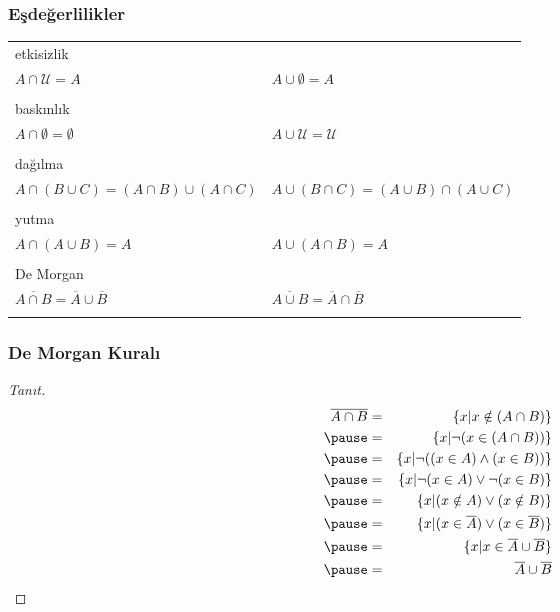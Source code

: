\documentclass[dvipsnames]{beamer}
\theoremstyle{definition}
\theoremstyle{example}
\theoremstyle{plain}
\begin{document}
\begin{frame}
  \frametitle{Eşdeğerlilikler}

  \begin{tabular}{ll}
    \alert{etkisizlik} &\\
      $A \cap \mathcal{U} = A$ &
      $A \cup \emptyset = A$\\\\
    \pause
    \alert{baskınlık} &\\
      $A \cap \emptyset = \emptyset$ &
      $A \cup \mathcal{U} = \mathcal{U}$\\\\
    \pause
    \alert{dağılma} &\\
      $A \cap (B \cup C) = (A \cap B) \cup (A \cap C)$ &
      $A \cup (B \cap C) = (A \cup B) \cap (A \cup C)$\\\\
    \pause
    \alert{yutma} &\\
      $A \cap (A \cup B) = A$ &
      $A \cup (A \cap B) = A$\\\\
    \pause
    \alert{De Morgan} &\\
      $\overline{A \cap B} = \overline{A} \cup \overline{B}$ &
      $\overline{A \cup B} = \overline{A} \cap \overline{B}$\\\\
  \end{tabular}
\end{frame}

\begin{frame}
  \frametitle{De Morgan Kuralı}

  \begin{proof}[Tanıt]
    \begin{eqnarray*}
      \overline{A \cap B} & = & \{x | x \notin (A \cap B)\}\\\pause
                          & = & \{x | \neg (x \in (A \cap B))\}\\\pause
                          & = & \{x | \neg ((x \in A) \wedge (x \in B))\}\\\pause
                          & = & \{x | \neg (x \in A) \vee \neg (x \in B)\}\\\pause
                          & = & \{x | (x \notin A) \vee (x \notin B)\}\\\pause
                          & = & \{x | (x \in \overline{A}) \vee (x \in \overline{B})\}\\\pause
                          & = & \{x | x \in \overline{A} \cup \overline{B}\}\\\pause
                          & = & \overline{A} \cup \overline{B}
    \end{eqnarray*}
  \end{proof}
\end{frame}
\end{document}
